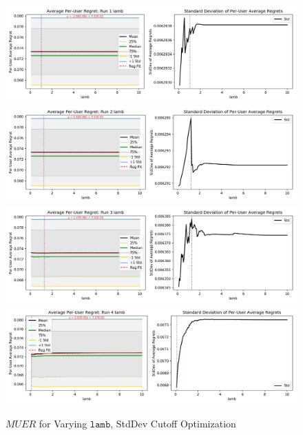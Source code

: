	\begin{figure}[H]
	\includegraphics[width=1.1\textwidth,center]{figures/opt_param/opt_param_std_11100_lamb1.png}%
	\newline
	\includegraphics[width=1.1\textwidth,center]{figures/opt_param/opt_param_std_11100_lamb2.png}%
	\newline
	\includegraphics[width=1.1\textwidth,center]{figures/opt_param/opt_param_std_11100_lamb3.png}%
	\newline
	\includegraphics[width=1.1\textwidth,center]{figures/opt_param/opt_param_std_11100_lamb4.png}%
	\caption{$MUER$ for Varying $\mathtt{lamb}$, StdDev Cutoff Optimization}
	\end{figure}

